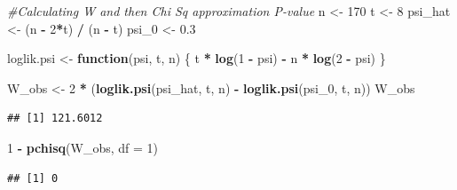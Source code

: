\documentclass[
  11pt,
]{article}
\newenvironment{Shaded}{\begin{snugshade}}{\end{snugshade}}
\newcommand{\AttributeTok}[1]{\textcolor[rgb]{0.13,0.29,0.53}{#1}}
\newcommand{\CommentTok}[1]{\textcolor[rgb]{0.56,0.35,0.01}{\textit{#1}}}
\newcommand{\ControlFlowTok}[1]{\textcolor[rgb]{0.13,0.29,0.53}{\textbf{#1}}}
\newcommand{\DecValTok}[1]{\textcolor[rgb]{0.00,0.00,0.81}{#1}}
\newcommand{\FloatTok}[1]{\textcolor[rgb]{0.00,0.00,0.81}{#1}}
\newcommand{\FunctionTok}[1]{\textcolor[rgb]{0.13,0.29,0.53}{\textbf{#1}}}
\newcommand{\NormalTok}[1]{#1}
\newcommand{\OtherTok}[1]{\textcolor[rgb]{0.56,0.35,0.01}{#1}}
\newcommand{\SpecialCharTok}[1]{\textcolor[rgb]{0.81,0.36,0.00}{\textbf{#1}}}
\begin{document}
\begin{Shaded}
\begin{Highlighting}[]
\CommentTok{\#Calculating W and then Chi Sq approximation P{-}value}
\NormalTok{n }\OtherTok{\textless{}{-}} \DecValTok{170}
\NormalTok{t }\OtherTok{\textless{}{-}} \DecValTok{8}
\NormalTok{psi\_hat }\OtherTok{\textless{}{-}}\NormalTok{ (n }\SpecialCharTok{{-}} \DecValTok{2}\SpecialCharTok{*}\NormalTok{t) }\SpecialCharTok{/}\NormalTok{ (n }\SpecialCharTok{{-}}\NormalTok{ t)}
\NormalTok{psi\_0 }\OtherTok{\textless{}{-}} \FloatTok{0.3}

\NormalTok{loglik.psi }\OtherTok{\textless{}{-}} \ControlFlowTok{function}\NormalTok{(psi, t, n) \{}
\NormalTok{  t }\SpecialCharTok{*} \FunctionTok{log}\NormalTok{(}\DecValTok{1} \SpecialCharTok{{-}}\NormalTok{ psi) }\SpecialCharTok{{-}}\NormalTok{ n }\SpecialCharTok{*} \FunctionTok{log}\NormalTok{(}\DecValTok{2} \SpecialCharTok{{-}}\NormalTok{ psi)}
\NormalTok{\}}

\NormalTok{W\_obs }\OtherTok{\textless{}{-}} \DecValTok{2} \SpecialCharTok{*}\NormalTok{ (}\FunctionTok{loglik.psi}\NormalTok{(psi\_hat, t, n) }\SpecialCharTok{{-}} \FunctionTok{loglik.psi}\NormalTok{(psi\_0, t, n))}
\NormalTok{W\_obs}
\end{Highlighting}
\end{Shaded}

\begin{verbatim}
## [1] 121.6012
\end{verbatim}

\begin{Shaded}
\begin{Highlighting}[]
\DecValTok{1} \SpecialCharTok{{-}} \FunctionTok{pchisq}\NormalTok{(W\_obs, }\AttributeTok{df =} \DecValTok{1}\NormalTok{)}
\end{Highlighting}
\end{Shaded}

\begin{verbatim}
## [1] 0
\end{verbatim}
\end{document}
